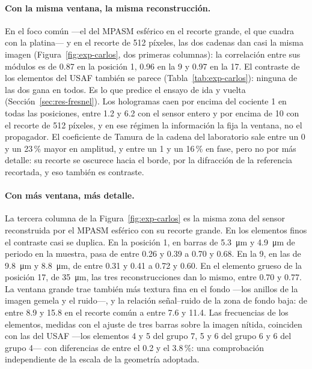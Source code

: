 \paragraph{Con la misma ventana, la misma reconstrucción.} En el foco común
---el del MPASM esférico en el recorte grande, el que cuadra con la
platina--- y en el recorte de 512 píxeles, las dos cadenas dan casi la misma
imagen (Figura~\ref{fig:exp-carlos}, dos primeras columnas): la correlación
entre sus módulos es de 0.87 en la posición 1, 0.96 en la 9 y 0.97 en la 17.
El contraste de los elementos del USAF también se parece
(Tabla~\ref{tab:exp-carlos}): ninguna de las dos gana en todos. Es lo que
predice el ensayo de ida y vuelta (Sección~\ref{sec:res-fresnel}). Los
hologramas caen por encima del cociente 1 en todas las posiciones, entre 1.2
y 6.2 con el sensor entero y por encima de 10 con el recorte de 512 píxeles,
y en ese régimen la información la fija la ventana, no el propagador. El
coeficiente de Tamura de la cadena del laboratorio sale entre un 0 y un
23\,\% mayor en amplitud, y entre un 1 y un 16\,\% en fase, pero no por más
detalle: su recorte se oscurece hacia el borde, por la difracción de la
referencia recortada, y eso también es contraste.

\paragraph{Con más ventana, más detalle.} La tercera columna de la
Figura~\ref{fig:exp-carlos} es la misma zona del sensor reconstruida por el
MPASM esférico con su recorte grande. En los elementos finos el contraste
casi se duplica. En la posición 1, en barras de \SI{5.3}{\micro\metre} y
\SI{4.9}{\micro\metre} de periodo en la muestra, pasa de entre 0.26 y 0.39 a
0.70 y 0.68. En la 9, en las de \SI{9.8}{\micro\metre} y
\SI{8.8}{\micro\metre}, de entre 0.31 y 0.41 a 0.72 y 0.60. En el elemento
grueso de la posición 17, de \SI{35}{\micro\metre}, las tres
reconstrucciones dan lo mismo, entre 0.70 y 0.77. La ventana grande trae
también más textura fina en el fondo ---los anillos de la imagen gemela y el
ruido---, y la relación señal--ruido de la zona de fondo baja: de entre 8.9 y
15.8 en el recorte común a entre 7.6 y 11.4. Las frecuencias de los elementos,
medidas con el ajuste de tres barras sobre la imagen nítida, coinciden con
las del USAF ---los elementos 4 y 5 del grupo 7, 5 y 6 del grupo 6 y 6 del
grupo 4--- con diferencias de entre el 0.2 y el 3.8\,\%: una comprobación
independiente de la escala de la geometría adoptada.

